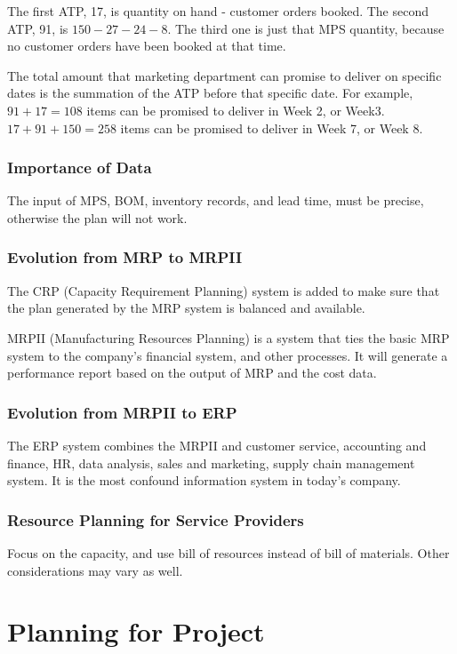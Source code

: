 \documentclass{article}
\begin{document}
The first ATP, 17, is quantity on hand - customer orders booked.
The second ATP, 91, is $150-27-24-8$.
The third one is just that MPS quantity, because no customer orders have been booked at that time.

The total amount that marketing department can promise to deliver on specific dates
is the summation of the ATP before that specific date.
For example, $91+17=108$ items can be promised to deliver in Week 2, or Week3.
$17+91+150=258$ items can be promised to deliver in Week 7, or Week 8.

\subsubsection{Importance of Data}

The input of MPS, BOM, inventory records, and lead time, must be precise,
otherwise the plan will not work.

\subsubsection{Evolution from MRP to MRPII}

The CRP (Capacity Requirement Planning) system is added to make sure that
the plan generated by the MRP system is balanced and available.

MRPII (Manufacturing Resources Planning) is a system that ties the basic MRP system to the company's financial system,
and other processes.
It will generate a performance report based on the output of MRP and the cost data.

\subsubsection{Evolution from MRPII to ERP}

The ERP system combines the MRPII and customer service, accounting and finance, HR, data analysis, sales and marketing, supply chain management system.
It is the most confound information system in today's company.

\subsubsection{Resource Planning for Service Providers}

Focus on the capacity, and use bill of resources instead of bill of materials.
Other considerations may vary as well.

\section{Planning for Project}
\end{document}
